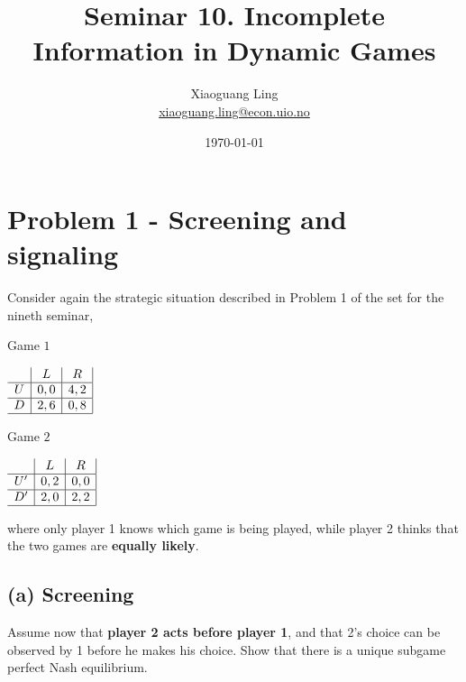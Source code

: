 \documentclass{article}
\title{Seminar 10. Incomplete Information in Dynamic Games}
\author{Xiaoguang Ling \\  \href{xiaoguang.ling@econ.uio.no}{xiaoguang.ling@econ.uio.no}}
\date{\today}
\begin{document}
\maketitle
 
\section{Problem 1 - Screening and signaling}

Consider again the strategic situation described in Problem 1 of the set for the nineth seminar, 

\begin{center}
Game $1$ \vspace{6pt}

$
\begin{array}{c|c|c|}
 & L & R \\
\hline
U & 0,0 & 4,2 \\
\hline
D & 2,6 & 0,8 \\
\hline
\end{array}
$
\end{center}

\begin{center}
Game $2$ \vspace{6pt}

$
\begin{array}{c|c|c|}
 & L & R \\
\hline
U' & 0,2 & 0,0 \\
\hline
D' & 2,0 & 2,2 \\
\hline
\end{array}
$
\end{center}

where only player 1 knows which game is being played, while player 2 thinks that the two games are \textbf{equally likely}.


\subsection{(a) Screening} Assume now that \textbf{player 2 acts before player 1}, and that 2's choice can be observed by 1 before he makes his choice. Show that there is a unique subgame perfect Nash equilibrium. 
\end{document}
